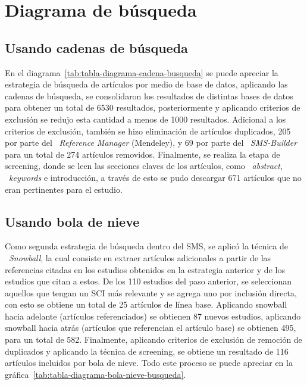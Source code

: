 \section{Diagrama de búsqueda}\label{sec:diagramaBusqueda}

\subsection{Usando cadenas de búsqueda}
En el diagrama~\ref{tab:tabla-diagrama-cadena-busqueda} se puede apreciar la estrategia de búsqueda de artículos por medio de base de datos, aplicando las cadenas de búsqueda, se consolidaron los resultados de distintas bases de datos para obtener un total de 6530 resultados, posteriormente y aplicando criterios de exclusión se redujo esta cantidad a menos de 1000 resultados. Adicional a los criterios de exclusión, también se hizo eliminación de artículos duplicados, 205 por parte del ~\textit{Reference Manager} (Mendeley), y 69 por parte del ~\textit{SMS-Builder} para un total de 274 artículos removidos. Finalmente, se realiza la etapa de screening, donde se leen las secciones claves de los artículos, como ~\textit{abstract}, ~\textit{keywords} e introducción, a través de esto se pudo descargar 671 artículos que no eran pertinentes para el estudio.
\label{img:busqueda-bd}

\subsection{Usando bola de nieve}
Como segunda estrategia de búsqueda dentro del SMS, se aplicó la técnica de ~\textit{Snowball}, la cual consiste en extraer artículos adicionales a partir de las referencias citadas en los estudios obtenidos en la estrategia anterior y de los estudios que citan a estos. De los 110 estudios del paso anterior, se seleccionan aquellos que tengan un SCI más relevante y se agrega uno por inclusión directa, con esto se obtiene un total de 25 artículos de línea base. Aplicando snowball hacia adelante (artículos referenciados) se obtienen 87 nuevos estudios, aplicando snowball hacia atrás (artículos que referencian el artículo base) se obtienen 495, para un total de 582. Finalmente, aplicando criterios de exclusión de remoción de duplicados y aplicando la técnica de screening, se obtiene un resultado de 116 artículos incluidos por bola de nieve. Todo este proceso se puede apreciar en la gráfica~\ref{tab:tabla-diagrama-bola-nieve-busqueda}.


